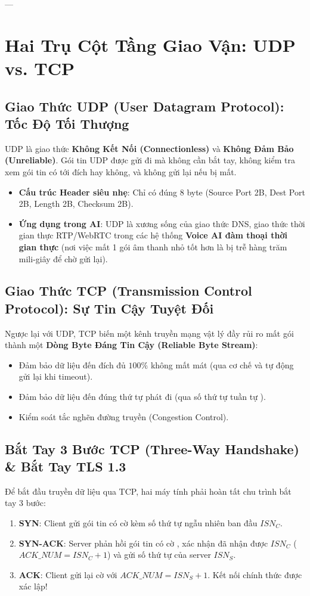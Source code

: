 ---

\section{Hai Trụ Cột Tầng Giao Vận: UDP vs. TCP}
\label{sec:tcp-vs-udp}

\subsection{Giao Thức UDP (User Datagram Protocol): Tốc Độ Tối Thượng}
UDP là giao thức \textbf{Không Kết Nối (Connectionless)} và \textbf{Không Đảm Bảo (Unreliable)}. Gói tin UDP được gửi đi mà không cần bắt tay, không kiểm tra xem gói tin có tới đích hay không, và không gửi lại nếu bị mất.
\begin{itemize}
  \item \textbf{Cấu trúc Header siêu nhẹ}: Chỉ có đúng 8 byte (Source Port 2B, Dest Port 2B, Length 2B, Checksum 2B).
  \item \textbf{Ứng dụng trong AI}: UDP là xương sống của giao thức DNS, giao thức thời gian thực RTP/WebRTC trong các hệ thống \textbf{Voice AI đàm thoại thời gian thực} (nơi việc mất 1 gói âm thanh nhỏ tốt hơn là bị trễ hàng trăm mili-giây để chờ gửi lại).
\end{itemize}

\subsection{Giao Thức TCP (Transmission Control Protocol): Sự Tin Cậy Tuyệt Đối}
Ngược lại với UDP, TCP biến một kênh truyền mạng vật lý đầy rủi ro mất gói thành một \textbf{Dòng Byte Đáng Tin Cậy (Reliable Byte Stream)}:
\begin{itemize}
  \item Đảm bảo dữ liệu đến đích đủ $100\%$ không mất mát (qua cơ chế  và tự động gửi lại khi timeout).
  \item Đảm bảo dữ liệu đến đúng thứ tự phát đi (qua số thứ tự tuần tự ).
  \item Kiểm soát tắc nghẽn đường truyền (Congestion Control).
\end{itemize}

\subsection{Bắt Tay 3 Bước TCP (Three-Way Handshake) \& Bắt Tay TLS 1.3}
Để bắt đầu truyền dữ liệu qua TCP, hai máy tính phải hoàn tất chu trình bắt tay 3 bước:
\begin{enumerate}
  \item \textbf{SYN}: Client gửi gói tin có cờ  kèm số thứ tự ngẫu nhiên ban đầu $ISN_C$.
  \item \textbf{SYN-ACK}: Server phản hồi gói tin có cờ , xác nhận đã nhận được $ISN_C$ ($ACK\_NUM = ISN_C + 1$) và gửi số thứ tự của server $ISN_S$.
  \item \textbf{ACK}: Client gửi lại cờ  với $ACK\_NUM = ISN_S + 1$. Kết nối chính thức được xác lập!
\end{enumerate}

